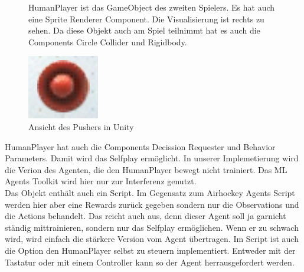 \begin{figure} [h]

\begin{minipage}[t]{0.6\textwidth}
\vspace{0pt}
HumanPlayer ist das GameObject des zweiten Spielers. Es hat auch eine Sprite Renderer Component. Die Visualisierung ist rechts zu sehen. Da diese Objekt auch am Spiel teilnimmt hat es auch die Components Circle Collider und Rigidbody.
\end{minipage}
\hspace{0.1\textwidth}
\begin{minipage}[t]{0.2\textwidth}
\vspace{0pt}
\includegraphics[width=\textwidth]{images/pusher_unity}
 \caption{Ansicht des Pushers in Unity}
 \label{unity_pusher}
\end{minipage}
\end{figure}

HumanPlayer hat auch die Components Decission Requester und Behavior Parameters. Damit wird das Selfplay ermöglicht. In unserer Implemetierung wird die Verion des Agenten, die den HumanPlayer bewegt nicht trainiert. Das ML Agents Toolkit wird hier nur zur Interferenz genutzt. \\
Das Objekt enthält auch ein Script. Im Gegensatz zum Airhockey Agents Script werden hier aber eine Rewards zurück gegeben sondern nur die Observations und die Actions behandelt. Das reicht auch aus, denn dieser Agent soll ja garnicht ständig mittrainieren, sondern nur das Selfplay ermöglichen. Wenn er zu schwach wird, wird einfach die stärkere Version vom Agent übertragen. Im Script ist auch die Option den HumanPlayer selbst zu steuern implementiert. Entweder mit der Tastatur oder mit einem Controller kann so der Agent herrausgefordert werden. \\

